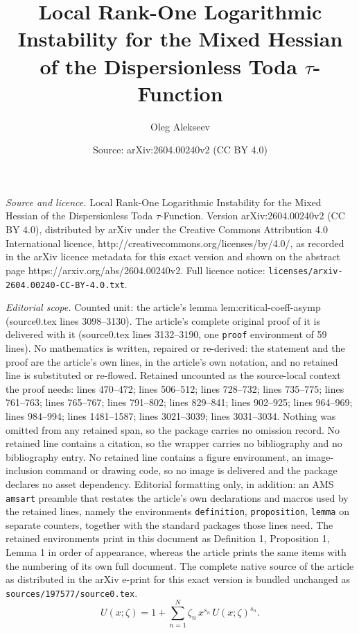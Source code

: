 \documentclass[10pt,a4paper]{amsart}
\title{Local Rank-One Logarithmic Instability for the Mixed Hessian of the Dispersionless Toda $\tau$-Function}
\author{Oleg Alekseev}
\date{Source: arXiv:2604.00240v2 (CC BY 4.0)}
\begin{document}
\maketitle

\noindent\emph{Source and licence.} Local Rank-One Logarithmic Instability for the Mixed Hessian of the Dispersionless Toda $\tau$-Function. Version arXiv:2604.00240v2 (CC BY 4.0), distributed by arXiv under the Creative Commons Attribution 4.0 International licence, http://creativecommons.org/licenses/by/4.0/, as recorded in the arXiv licence metadata for this exact version and shown on the abstract page https://arxiv.org/abs/2604.00240v2. Full licence notice: \texttt{licenses/arxiv-2604.00240-CC-BY-4.0.txt}.\par\smallskip

\noindent\textit{Editorial scope.} Counted unit: the article's lemma lem:critical-coeff-asymp (source0.tex lines 3098--3130). The article's complete original proof of it is delivered with it (source0.tex lines 3132--3190, one \texttt{proof} environment of 59 lines). No mathematics is written, repaired or re-derived: the statement and the proof are the article's own lines, in the article's own notation, and no retained line is substituted or re-flowed.  Retained uncounted as the source-local context the proof needs: lines 470--472; lines 506--512; lines 728--732; lines 735--775; lines 761--763; lines 765--767; lines 791--802; lines 829--841; lines 902--925; lines 964--969; lines 984--994; lines 1481--1587; lines 3021--3039; lines 3031--3034.  Nothing was omitted from any retained span, so the package carries no omission record.  No retained line contains a citation, so the wrapper carries no bibliography and no bibliography entry.  No retained line contains a figure environment, an image-inclusion command or drawing code, so no image is delivered and the package declares no asset dependency.  Editorial formatting only, in addition: an AMS \texttt{amsart} preamble that restates the article's own declarations and macros used by the retained lines, namely the environments \texttt{definition}, \texttt{proposition}, \texttt{lemma} on separate counters, together with the standard packages those lines need.  The retained environments print in this document as Definition 1, Proposition 1, Lemma 1 in order of appearance, whereas the article prints the same items with the numbering of its own full document.  The complete native source of the article as distributed in the arXiv e-print for this exact version is bundled unchanged as \texttt{sources/197577/source0.tex}.
	\begin{equation}\label{eq:inv-eq}
		U(x;\zeta)=1+\sum_{n=1}^N \zeta_n\,x^{s_n}\,U(x;\zeta)^{s_n}.
	\end{equation}
\end{document}
